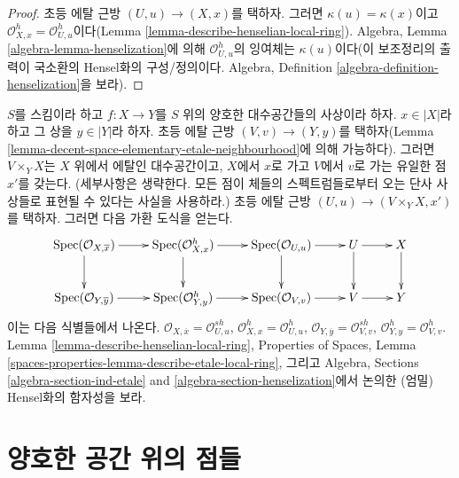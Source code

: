 \begin{proof}
초등 에탈 근방 $(U, u) \to (X, x)$를 택하자. 그러면
$\kappa(u) = \kappa(x)$이고
$\mathcal{O}_{X, x}^h = \mathcal{O}_{U, u}^h$이다(Lemma
\ref{lemma-describe-henselian-local-ring}). Algebra, Lemma
\ref{algebra-lemma-henselization}에 의해 $\mathcal{O}_{U, u}^h$의
잉여체는 $\kappa(u)$이다(이 보조정리의 출력이 국소환의 Hensel화의
구성/정의이다. Algebra, Definition
\ref{algebra-definition-henselization}을 보라).
\end{proof}

\begin{remark}
\label{remark-functoriality-henselian-local-ring}
$S$를 스킴이라 하고 $f : X \to Y$를 $S$ 위의 양호한 대수공간들의
사상이라 하자. $x \in |X|$라 하고 그 상을 $y \in |Y|$라 하자.
초등 에탈 근방 $(V, v) \to (Y, y)$를 택하자(Lemma
\ref{lemma-decent-space-elementary-etale-neighbourhood}에 의해 가능하다).
그러면 $V \times_Y X$는 $X$ 위에서 에탈인 대수공간이고, $X$에서
$x$로 가고 $V$에서 $v$로 가는 유일한 점 $x'$를 갖는다.
(세부사항은 생략한다. 모든 점이 체들의 스펙트럼들로부터 오는 단사
사상들로 표현될 수 있다는 사실을 사용하라.) 초등 에탈 근방
$(U, u) \to (V \times_Y X, x')$를 택하자. 그러면 다음 가환 도식을
얻는다.
$$
\xymatrix{
\Spec(\mathcal{O}_{X, \overline{x}}) \ar[r] \ar[d] &
\Spec(\mathcal{O}_{X, x}^h) \ar[r] \ar[d] &
\Spec(\mathcal{O}_{U, u}) \ar[r] \ar[d] &
U \ar[r] \ar[d] &
X \ar[d] \\
\Spec(\mathcal{O}_{Y, \overline{y}}) \ar[r] &
\Spec(\mathcal{O}_{Y, y}^h) \ar[r] &
\Spec(\mathcal{O}_{V, v}) \ar[r] &
V \ar[r] &
Y
}
$$
이는 다음 식별들에서 나온다.
$\mathcal{O}_{X, \overline{x}} = \mathcal{O}_{U, u}^{sh}$,
$\mathcal{O}_{X, x}^h = \mathcal{O}_{U, u}^h$,
$\mathcal{O}_{Y, \overline{y}} = \mathcal{O}_{V, v}^{sh}$,
$\mathcal{O}_{Y, y}^h = \mathcal{O}_{V, v}^h$.
Lemma \ref{lemma-describe-henselian-local-ring}, Properties of Spaces,
Lemma \ref{spaces-properties-lemma-describe-etale-local-ring}, 그리고
Algebra, Sections \ref{algebra-section-ind-etale} and
\ref{algebra-section-henselization}에서 논의한 (엄밀) Hensel화의
함자성을 보라.
\end{remark}






\section{양호한 공간 위의 점들}
\label{section-points}

